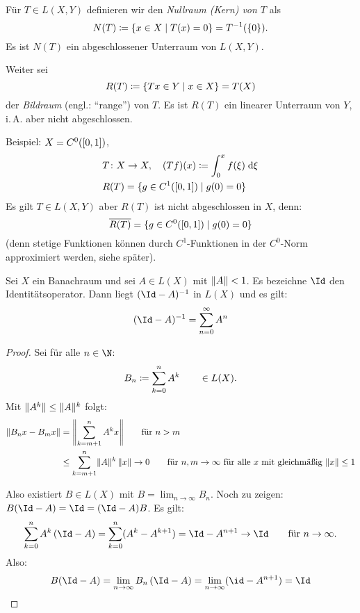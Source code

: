 \begin{thDef}
    Für $T\in L(X,Y)$ definieren wir den \emph{Nullraum (Kern) von $T$} als
    \[ N(T) \defeq \{ x\in X \Mid T(x) = 0 \}
        = T^{-1}(\{0\})
    . \]
    Es ist $N(T)$ ein abgeschlossener Unterraum von $L(X,Y)$.
    
    Weiter sei
    \[ R(T) \defeq \{ Tx\in Y \Mid x\in X \} = T(X) \]
    der \emph{Bildraum} (engl.: \enquote{range}) von $T$.
    Es ist $R(T)$ ein linearer Unterraum von $Y$, i.\,A. aber nicht
    abgeschlossen.
    
    Beispiel: $X=C^0(\I)$,
    \begin{align*}
        &T\colon X\to X, \quad (Tf)(x) \defeq \int_0^x f(\xi) \dif{\xi}
        \\
        &R(T) = \{ g\in C^1(\I) \Mid g(0) = 0 \}
    \end{align*}
    Es gilt $T \in L(X,Y)$ aber $R(T)$ ist nicht abgeschlossen in $X$, denn:
    \[ \setclosure{R(T)} = \{ g\in C^0(\I) \Mid g(0) = 0 \}  \]
    (denn stetige Funktionen können durch $C^1$-Funktionen in der $C^0$-Norm
    approximiert werden, siehe später). %
\end{thDef}

\begin{thSatz}
    Sei $X$ ein Banachraum und sei $A\in L(X)$ mit $\norm{A}<1$.
    Es bezeichne $\Id$ den Identitätsoperator.
    Dann liegt $(\Id-A)^{-1}$ in $L(X)$ und es gilt:
    \[ (\Id-A)^{-1} = \nsum[0]^\infty A^n \]
\end{thSatz}

\begin{proof}
    Sei für alle $n\in\N$:
    \[ B_n \defeq \ksum[0]^n A^k \qquad\in L(X)  . \]
    Mit $\norm{A^k}\leq \norm{A}^k$ folgt:
    \begin{align*}
        \norm{B_n x - B_m x} &= \norm*{ \ksum[m+1]^n A^k x }
        \fuer n > m
        \\
        &\leq \ksum[m+1]^n \norm{A}^k \, \norm{x}
        \to 0 \fuer n,m\to\infty \text{ für alle $x$ mit 
            gleichmäßig $\norm{x}\leq 1$}
    \end{align*}
    
    Also existiert $B\in L(X)$ mit $B=\lim_{n\to\infty} B_n$.
    Noch zu zeigen: $B(\Id-A) = \Id = (\Id-A)B$. Es gilt:
    \[ \ksum[0]^n A^k\, (\Id-A) 
    = \ksum[0]^n (A^k-A^{k+1}) = \Id - A^{n+1} 
    \to \Id \fuer n\to\infty
    . \]
    Also:
    \[ B(\Id-A) = \lim_{n\to\infty} B_n \, (\Id-A)
        = \lim_{n\to\infty} (\id-A^{n+1}) = \Id 
    \]
\end{proof}







